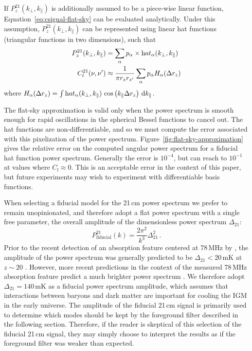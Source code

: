 \begin{bibunit}
If $P_z^{21}(k_\perp, k_\parallel)$ is additionally assumed to be a piece-wise linear function,
Equation~\ref{eq:csignal-flat-sky} can be evaluated analytically. Under this assumption,
$P_z^{21}(k_\perp, k_\parallel)$ can be represented using linear hat functions (triangular functions
in two dimensions), such that
\begin{align}
    P_z^{21}(k_\perp, k_\parallel) &= \sum_\alpha p_\alpha
        \times {\rm hat}_\alpha(k_\perp, k_\parallel)
        \label{eq:palpha} \\
    C^{21}_l(\nu, \nu^\prime) &\approx
        \frac{1}{\pi r_z r_{z^\prime}}
        \sum_\alpha p_\alpha H_\alpha(\Delta r_z)
\end{align}
where $H_\alpha(\Delta r_z) = \int {\rm hat}_\alpha(k_\perp, k_\parallel) \, \cos\left(k_\parallel
\Delta r_z\right) \, \d k_\parallel$.

The flat-sky approximation is valid only when the power spectrum is smooth enough for rapid
oscillations in the spherical Bessel functions to cancel out. The hat functions are
non-differentiable, and so we must compute the error associated with this pixelization of the power
spectrum. Figure~\ref{fig:flat-sky-approximation} gives the relative error on the computed angular
power spectrum for a fiducial hat function power spectrum. Generally the error is $10^{-4}$, but can
reach to $10^{-1}$ at values where $C_l \approx 0$. This is an acceptable error in the context of
this paper, but future experiments may wish to experiment with differentiable basis functions.

When selecting a fiducial model for the 21\,cm power spectrum we prefer to remain unopinionated, and
therefore adopt a flat power spectrum with a single free parameter, the overall amplitude of the
dimensionless power spectrum $\Delta_{21}$:
\begin{equation}
    P_\text{fiducial}^{21}(k) = \frac{2\pi^2}{k^3}\Delta_{21}^2\,.
\end{equation}
Prior to the recent detection of an absorption feature centered at 78\,MHz by
\citet{2018Natur.555...67B}, the amplitude of the power spectrum was generally predicted to be
$\Delta_{21} < 20\,\text{mK}$ at $z\sim 20$ \citep[e.g.,][]{2014MNRAS.437L..36F}. However, more
recent predictions in the context of the measured 78\,MHz absorption feature predict a much brighter
power spectrum \citep[e.g.][]{2018Natur.555...71B, 2018arXiv180503254K}. We therefore adopt
$\Delta_{21} = 140\,\text{mK}$ as a fiducial power spectrum amplitude, which assumes that
interactions between baryons and dark matter are important for cooling the IGM in the early
universe. The amplitude of the fiducial 21\,cm signal is primarily used to determine which modes
should be kept by the foreground filter described in the following section. Therefore, if the reader
is skeptical of this selection of the fiducial 21\,cm signal, they may simply choose to interpret
the results as if the foreground filter was weaker than expected.


\end{bibunit}
